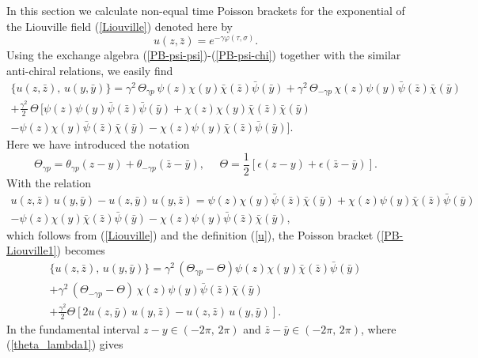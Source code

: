 \documentclass[a4paper,12pt]{article}
\begin{document}
\noindent
In this section we calculate non-equal time Poisson brackets for the
exponential of the Liouville field (\ref{Liouville}) denoted here by
\begin{equation}\label{u}
u(z,\bar z)=
e^{-\gamma \varphi(\tau, \sigma)}.
\end{equation}
Using the exchange algebra
(\ref{PB-psi-psi})-(\ref{PB-psi-chi}) together with the similar
 anti-chiral relations,  we easily find
\begin{eqnarray}\label{PB-Liouville1}
\{u(z, \bar z),\, u(y, \bar y)\}=\gamma^2\,\Theta_{\gamma p}\,
\psi(z)\chi(y)\bar\chi(\bar z)\bar\psi(\bar y)+
\gamma^2\,\Theta_{-\gamma p}\,\chi(z)\psi(y)\bar\psi(\bar z)\bar\chi(\bar y)
\nonumber\\
+\frac{\gamma^2}{2}\,\Theta\,
[\psi(z)\psi(y)\bar\psi(\bar z)\bar\psi(\bar y)
+\chi(z)\chi(y)\bar\chi(\bar z)\bar\chi(\bar y)
\nonumber\\
-\psi(z)\chi(y)\bar\psi(\bar z)\bar\chi(\bar y)
-\chi(z)\psi(y)\bar\chi(\bar z)\bar\psi(\bar y)].
\end{eqnarray}
Here we have introduced the notation
\begin{equation}\label{Theta}
\Theta_{\gamma p}=\theta_{\gamma p}(z-y)+\theta_{-\gamma p}(\bar z-\bar y),
~~~~~~\Theta = \frac{1}{2}[\epsilon(z-y)+\epsilon(\bar z-\bar y)].
\end{equation}
With the relation
\begin{eqnarray}\label{uu-uu}
u(z, \bar z)\, u(y, \bar y)- u(z, \bar y)\, u(y, \bar z)
=\psi(z)\chi(y)\bar\psi(\bar z)\bar\chi(\bar y)
+\chi(z)\psi(y)\bar\chi(\bar z)\bar\psi(\bar y) \nonumber \\
-\psi(z)\chi(y)\bar\chi(\bar z)\bar\psi(\bar y)-
\chi(z)\psi(y)\bar\psi(\bar z)\bar\chi(\bar y),
\end{eqnarray}
which follows from (\ref{Liouville}) and the definition (\ref{u}), the
Poisson bracket (\ref{PB-Liouville1}) becomes
\begin{eqnarray}\label{PB-Liouville2}
\{u(z, \bar z),\, u(y, \bar y)\}=\gamma^2\,(\Theta_{\gamma p}-\Theta)
\psi(z)\chi(y)\bar\chi(\bar z)\bar\psi(\bar y)\nonumber\\
+\gamma^2\,(\Theta_{-\gamma p}-\Theta)
\,\chi(z)\psi(y)\bar\psi(\bar z)\bar\chi(\bar y)\nonumber\\
+\frac{\gamma^2}{2}
\Theta[2u(z, \bar y)\, u(y, \bar z) -u(z, \bar z)\, u(y, \bar y)].
\end{eqnarray}
In the fundamental interval $ z-y\in (-2\pi,\,2\pi)$ and $\bar z-\bar
y\in (-2\pi,\,2\pi)$, where (\ref{theta_lambda1}) gives
\end{document}
